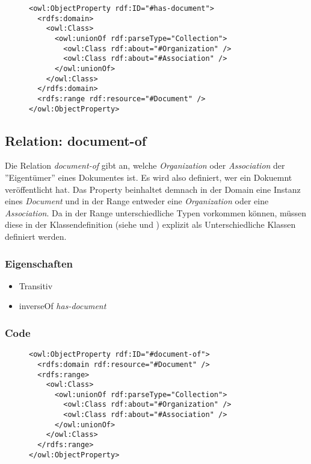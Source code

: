 \documentclass[
    11pt,
    latin1,
    a4paper,
    oneside
]{scrreprt}
\begin{document}
\begin{figure}[h]
 \lstset{language=XML}
 \begin{lstlisting}[label=owl:hasdocument,caption={Die Relation \emph{has-document} verkn\"upft eine \emph{Organization} mit einem \emph{Document}}]
<owl:ObjectProperty rdf:ID="#has-document">
  <rdfs:domain>
    <owl:Class>
      <owl:unionOf rdf:parseType="Collection">
        <owl:Class rdf:about="#Organization" />
        <owl:Class rdf:about="#Association" />
      </owl:unionOf>
    </owl:Class>
  </rdfs:domain>
  <rdfs:range rdf:resource="#Document" />
</owl:ObjectProperty>
 \end{lstlisting}
\end{figure}


\subsection{Relation: document-of} \label{sec:rel_documentof}

Die Relation \emph{document-of} gibt an, welche \emph{Organization} oder \emph{Association} der ''Eigent\"umer'' eines Dokumentes ist. Es wird also definiert, wer ein Dokuemnt ver\"offentlicht hat. Das Property beinhaltet demnach in der Domain eine Instanz eines \emph{Document} und in der Range entweder eine \emph{Organization} oder eine \emph{Association}. Da in der Range unterschiedliche Typen vorkommen k\"onnen, m\"ussen diese in der Klassendefinition (siehe  und ) explizit als Unterschiedliche Klassen definiert werden.

\subsubsection{Eigenschaften} \label{sec:rel_documentof_settings}

\begin{itemize}
  \item Transitiv
  \item inverseOf \emph{has-document}
\end{itemize}

\subsubsection{Code} \label{sec:rel_documentof_code}

\begin{figure}[h]
 \lstset{language=XML}
 \begin{lstlisting}[label=owl:documentof,caption={Die Relation \emph{document-of} gibt an, welche \emph{Organization} oder \emph{Association} das \emph{Document} ver\"offentlicht hat}]
<owl:ObjectProperty rdf:ID="#document-of">
  <rdfs:domain rdf:resource="#Document" />
  <rdfs:range>
    <owl:Class>
      <owl:unionOf rdf:parseType="Collection">
        <owl:Class rdf:about="#Organization" />
        <owl:Class rdf:about="#Association" />
      </owl:unionOf>
    </owl:Class>
  </rdfs:range>
</owl:ObjectProperty>
 \end{lstlisting}
\end{figure}
\end{document}
